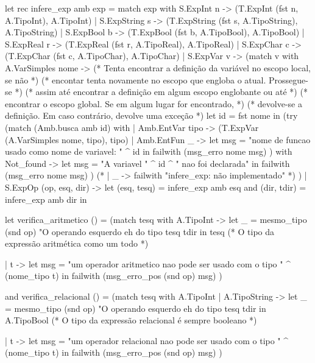 \documentclass[12pt,a4paper,twoside]{article}
\begin{document}
\begin{terminal}
let rec infere_exp amb exp =
  match exp with
    S.ExpInt n    -> (T.ExpInt (fst n, A.TipoInt),       A.TipoInt)
  | S.ExpString s -> (T.ExpString (fst s, A.TipoString), A.TipoString)
  | S.ExpBool b   -> (T.ExpBool (fst b, A.TipoBool),     A.TipoBool)
  | S.ExpReal r   -> (T.ExpReal (fst r, A.TipoReal),     A.TipoReal)
  | S.ExpChar c   -> (T.ExpChar (fst c, A.TipoChar),     A.TipoChar)
  | S.ExpVar v ->
    (match v with
       A.VarSimples nome ->
       (* Tenta encontrar a definição da variável no escopo local, se não      *)
       (* encontar tenta novamente no escopo que engloba o atual. Prossegue-se *)
       (* assim até encontrar a definição em algum escopo englobante ou até    *)
       (* encontrar o escopo global. Se em algum lugar for encontrado,         *)
       (* devolve-se a definição. Em caso contrário, devolve uma exceção       *)
       let id = fst nome in
         (try (match (Amb.busca amb id) with
               | Amb.EntVar tipo -> (T.ExpVar (A.VarSimples nome, tipo), tipo)
               | Amb.EntFun _ ->
                 let msg = "nome de funcao usado como nome de variavel: " ^ id in
                  failwith (msg_erro nome msg)
             )
          with Not_found ->
                 let msg = "A variavel " ^ id ^ " nao foi declarada" in
                 failwith (msg_erro nome msg)
         )
     (* | _ -> failwith "infere_exp: não implementado" *)
    )
  | S.ExpOp (op, esq, dir) ->
    let (esq, tesq) = infere_exp amb esq
    and (dir, tdir) = infere_exp amb dir in

    let verifica_aritmetico () =
      (match tesq with
         A.TipoInt ->
         let _ = mesmo_tipo (snd op)
                      "O operando esquerdo eh do tipo %
                      tesq tdir
         in tesq (* O tipo da expressão aritmética como um todo *)

       | t -> let msg = "um operador aritmetico nao pode ser usado com o tipo " ^
                        (nome_tipo t)
         in failwith (msg_erro_pos (snd op) msg)
      )

    and verifica_relacional () =
      (match tesq with
         A.TipoInt
       | A.TipoString ->
         let _ = mesmo_tipo (snd op)
                   "O operando esquerdo eh do tipo %
                   tesq tdir
         in A.TipoBool (* O tipo da expressão relacional é sempre booleano *)

       | t -> let msg = "um operador relacional nao pode ser usado com o tipo " ^
                        (nome_tipo t)
         in failwith (msg_erro_pos (snd op) msg)
      )


\end{terminal}
\end{document}
